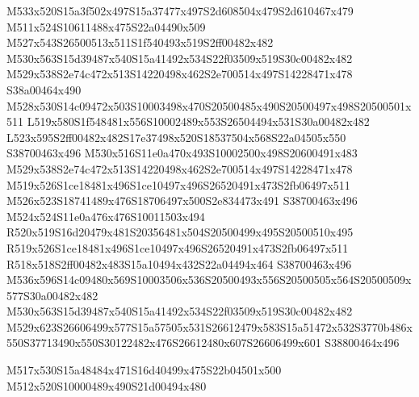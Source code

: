 \documentclass{article}
\begin{document}
\begin{multicols}{2}

M533x520S15a3f502x497S15a37477x497S2d608504x479S2d610467x479 M511x524S10611488x475S22a04490x509 M527x543S26500513x511S1f540493x519S2ff00482x482 M530x563S15d39487x540S15a41492x534S22f03509x519S30c00482x482 M529x538S2e74c472x513S14220498x462S2e700514x497S14228471x478 S38a00464x490 M528x530S14c09472x503S10003498x470S20500485x490S20500497x498S20500501x511 L519x580S1f548481x556S10002489x553S26504494x531S30a00482x482 L523x595S2ff00482x482S17e37498x520S18537504x568S22a04505x550 S38700463x496 M530x516S11e0a470x493S10002500x498S20600491x483 M529x538S2e74c472x513S14220498x462S2e700514x497S14228471x478 M519x526S1ce18481x496S1ce10497x496S26520491x473S2fb06497x511 M526x523S18741489x476S18706497x500S2e834473x491 S38700463x496 M524x524S11e0a476x476S10011503x494 R520x519S16d20479x481S20356481x504S20500499x495S20500510x495 R519x526S1ce18481x496S1ce10497x496S26520491x473S2fb06497x511 R518x518S2ff00482x483S15a10494x432S22a04494x464 S38700463x496 M536x596S14c09480x569S10003506x536S20500493x556S20500505x564S20500509x577S30a00482x482 M530x563S15d39487x540S15a41492x534S22f03509x519S30c00482x482 M529x623S26606499x577S15a57505x531S26612479x583S15a51472x532S3770b486x550S37713490x550S30122482x476S26612480x607S26606499x601 S38800464x496


\begin{center}
M517x530S15a48484x471S16d40499x475S22b04501x500 M512x520S10000489x490S21d00494x480 
\end{center}








\end{multicols}
\end{document}
